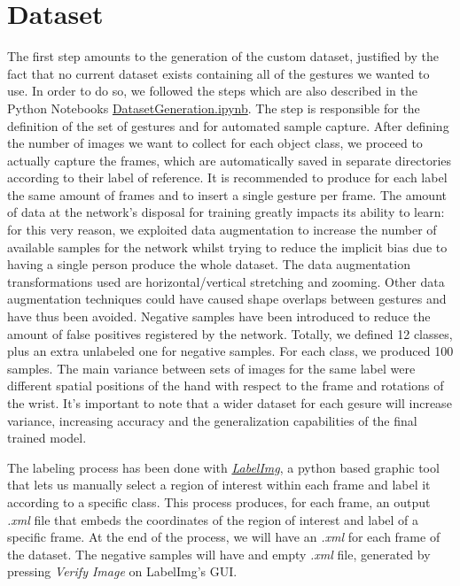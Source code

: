\documentclass[a4paper, 12pt]{article}
\begin{document}
\section{Dataset}
\begin{flushleft}
The first step amounts to the generation of the custom dataset, justified by the fact that no current dataset exists containing all of the gestures we wanted to use.
In order to do so, we followed the steps which are also described in the Python Notebooks \href{https://github.com/MarzioVallero/ML-Based-Blender-Gestural-Input-Interface/blob/master/DatasetGeneration.ipynb}{DatasetGeneration.ipynb}.\linebreak
The step is responsible for the definition of the set of gestures and for automated sample capture. After defining the number of images we want to collect for each object class, we proceed to actually capture the frames, which are automatically saved in separate directories according to their label of reference. It is recommended to produce for each label the same amount of frames and to insert a single gesture per frame.\linebreak
The amount of data at the network's disposal for training greatly impacts its ability to learn: for this very reason, we exploited data augmentation to increase the number of available samples for the network whilst trying to reduce the implicit bias due to having a single person produce the whole dataset. The data augmentation transformations used are horizontal/vertical stretching and zooming. Other data augmentation techniques could have caused shape overlaps between gestures and have thus been avoided. Negative samples have been introduced to reduce the amount of false positives registered by the network.\linebreak
Totally, we defined 12 classes, plus an extra unlabeled one for negative samples. For each class, we produced 100 samples.\linebreak
The main variance between sets of images for the same label were different spatial positions of the hand with respect to the frame and rotations of the wrist.\linebreak
It's important to note that a wider dataset for each gesure will increase variance, increasing accuracy and the generalization capabilities of the final trained model.

The labeling process has been done with \textit{\hyperref[Ref11]{LabelImg}}, a python based graphic tool that lets us manually select a region of interest within each frame and label it according to a specific class.
This process produces, for each frame, an output \textit{.xml} file that embeds the coordinates of the region of interest and label of a specific frame. At the end of the process, we will have an \textit{.xml} for each frame of the dataset. The negative samples will have and empty \textit{.xml} file, generated by pressing \textit{Verify Image} on LabelImg's GUI.\linebreak


\end{flushleft}
\end{document}
